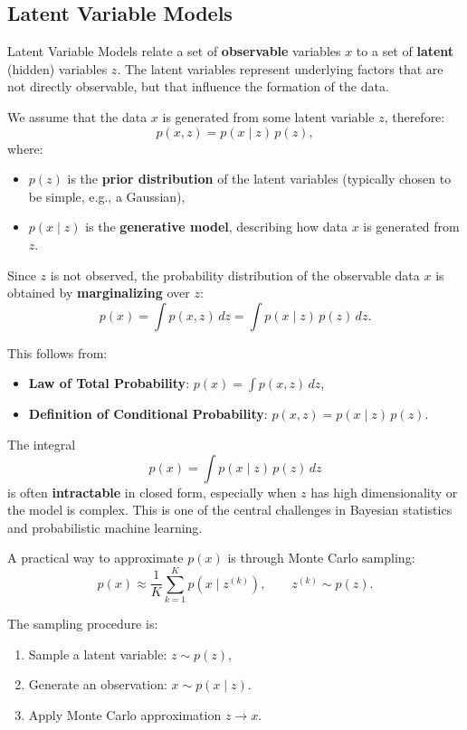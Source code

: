 \subsection{Latent Variable Models}
Latent Variable Models relate a set of \textbf{observable} variables $x$ to a set of \textbf{latent} (hidden) variables $z$.  
The latent variables represent underlying factors that are not directly observable, but that influence the formation of the data.

We assume that the data $x$ is generated from some latent variable $z$, therefore:
\[
p(x, z) = p(x \mid z)\, p(z),
\]
where:
\begin{itemize}
    \item $p(z)$ is the \textbf{prior distribution} of the latent variables (typically chosen to be simple, e.g., a Gaussian),
    \item $p(x \mid z)$ is the \textbf{generative model}, describing how data $x$ is generated from $z$.
\end{itemize}

Since $z$ is not observed, the probability distribution of the observable data $x$ is obtained by \textbf{marginalizing} over $z$:
\[
p(x) = \int p(x, z)\, dz = \int p(x \mid z)\, p(z)\, dz.
\]

This follows from:
\begin{itemize}
    \item \textbf{Law of Total Probability}: $\displaystyle p(x) = \int p(x, z)\, dz$,
    \item \textbf{Definition of Conditional Probability}: $\displaystyle p(x, z) = p(x \mid z)\, p(z)$.
\end{itemize}

The integral
\[
p(x) = \int p(x \mid z)\, p(z)\, dz
\]
is often \textbf{intractable} in closed form, especially when $z$ has high dimensionality or the model is complex.  
This is one of the central challenges in Bayesian statistics and probabilistic machine learning.

A practical way to approximate $p(x)$ is through Monte Carlo sampling:
\[
p(x) \approx \frac{1}{K} \sum_{k=1}^{K} p(x \mid z^{(k)}), \qquad z^{(k)} \sim p(z).
\]

The sampling procedure is:
\begin{enumerate}
    \item Sample a latent variable: $z \sim p(z)$,
    \item Generate an observation: $x \sim p(x \mid z)$.
    \item Apply Monte Carlo approximation $z \rightarrow x.$
\end{enumerate}

